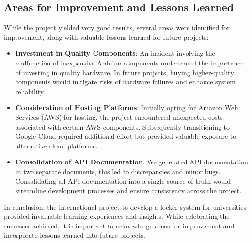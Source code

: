 \subsection{Areas for Improvement and Lessons Learned}

While the project yielded very good results, several areas were identified for improvement, along with valuable lessons learned for future projects:

\begin{itemize}
    \item \textbf{Investment in Quality Components}: An incident involving the malfunction of inexpensive Arduino components underscored the importance of investing in quality hardware. In future projects, buying higher-quality components would mitigate risks of hardware failures and enhance system reliability.

    \item \textbf{Consideration of Hosting Platforms}: Initially opting for Amazon Web Services (AWS) for hosting, the project encountered unexpected costs associated with certain AWS components. Subsequently transitioning to Google Cloud required additional effort but provided valuable exposure to alternative cloud platforms.

    \item \textbf{Consolidation of API Documentation}: We generated API documentation in two separate documents, this led to discrepancies and minor bugs. Consolidating all API documentation into a single source of truth would streamline development processes and ensure consistency across the project.
\end{itemize}

In conclusion, the international project to develop a locker system for universities provided invaluable learning experiences and insights. While celebrating the successes achieved, it is important to acknowledge areas for improvement and incorporate lessons learned into future projects.